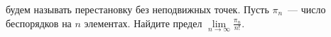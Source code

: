  будем называть перестановку без неподвижных точек. Пусть $\pi_n$~--- число беспорядков на $n$
элементах. Найдите предел $\lim\limits_{n \to \infty} \frac{\pi_n}{n!}$.
